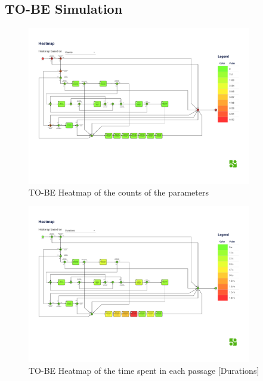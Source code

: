 \subsection{TO-BE Simulation}
\label{sec:to_be_simulation}




\begin{figure}[H]
    \centering
    \includegraphics[width=0.87\textwidth]{figures/TO-BE heatmap_counts.pdf}
    \caption{TO-BE Heatmap of the counts of the parameters}
    \label{fig:to_be_heatmap_counts}
\end{figure}

\begin{figure}[H]
    \centering
    \includegraphics[width=0.87\textwidth]{figures/TO-BE heatmap_durations.pdf}
    \caption{TO-BE Heatmap of the time spent in each passage [Durations]}
    \label{fig:to_be_heatmap_durations}
\end{figure}

